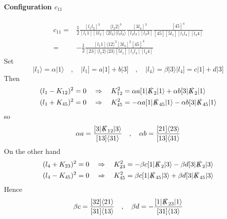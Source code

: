 \paragraph{Configuration $c_{11}$}
\begin{equation*}
\begin{split}
c_{11} = &
\frac{1}{2}\frac{[l_1 l_2]^3}{[l_1 1][1l_2]}
\frac{\langle l_2 2 \rangle^3}{\langle 2 l_3 \rangle\langle l_3 l_2 \rangle}
\frac{[3l_4]^3}{[l_4 l_3][l_3 3]}
\frac{[45]^4}{[45][5l_1][l_1l_4][l_4 4]}
\\
= &
-\frac{1}{2}
\frac{[l_1 1]\langle 12 \rangle^3[3l_4]^2[45]^3}{[23]\langle l_1 2 \rangle\langle 23 \rangle[5l_1][l_1l_4][l_4 4]}
\end{split}
\end{equation*}
%
Set
\begin{equation*}
|l_1\rangle = \alpha| 1\rangle \quad,\quad
|l_1] = a|1] + b|3] \quad,\quad
|l_4\rangle = \beta|3\rangle 
| l_4] = c|1] + d|3]
\end{equation*}
Then
\begin{equation*}
\begin{split}
& (l_1- K_{12})^2 = 0 \quad\Rightarrow\quad K_{12}^2 = \alpha a [1|\slashed{K}_2|1\rangle + \alpha b [3|\slashed{K}_2|1\rangle
\\
& (l_1 + K_{45})^2 = 0 \quad\Rightarrow\quad
K_{45}^2 = -\alpha a [1|\slashed{K}_{45}|1\rangle - \alpha b [3|\slashed{K}_{45}|1\rangle
\end{split}
\end{equation*}
so
\begin{equation*}
\alpha a = \frac{[3|\slashed{K}_{12}|3\rangle}{[13]\langle 31\rangle}
\quad,\quad
\alpha b = \frac{[21]\langle 23\rangle}{[13]\langle 31\rangle}
\end{equation*}
On the other hand
\begin{equation*}
\begin{split}
& (l_4 + K_{23})^2 = 0 \quad\Rightarrow\quad K_{23}^2 = -\beta c[1|\slashed{K}_2|3\rangle - \beta d [3|\slashed{K}_2|3\rangle
\\
& (l_4 - K_{45})^2 = 0 \quad\Rightarrow\quad K_{45}^2 = \beta c [1|\slashed{K}_{45}|3\rangle + \beta d [3|\slashed{K}_{45}|3\rangle
\end{split}
\end{equation*}
Hence
\begin{equation*}
\beta c = \frac{[32]\langle 21\rangle}{[31]\langle 13\rangle}
\quad,\quad
\beta d = -\frac{[1|\slashed{K}_{23}|1\rangle}{[31]\langle 13\rangle}
\end{equation*}
